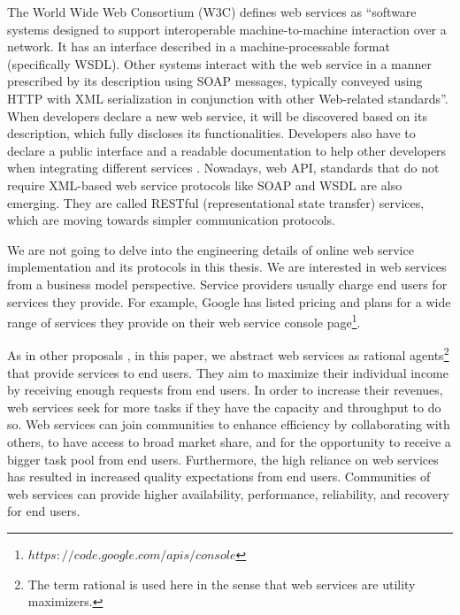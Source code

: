 The World Wide Web Consortium (W3C) defines web services as ``software systems designed to support interoperable machine-to-machine interaction over a network. It has an interface described in a machine-processable format (specifically WSDL). Other systems interact with the web service in a manner prescribed by its description using SOAP messages, typically conveyed using HTTP with XML serialization in conjunction with other Web-related standards''. When developers declare a new web service, it will be
discovered based on its description, which fully discloses its functionalities. Developers also have to declare a public interface and a readable documentation to help other developers when integrating different services \cite{w3cwsdl}. Nowadays, web API, standards that do not require XML-based web service protocols like SOAP and WSDL are also emerging. They are called RESTful (representational state transfer) services, which are moving towards simpler communication protocols.

We are not going to delve into the engineering details of online web service implementation and its protocols in this thesis. We are interested in web services from a business model perspective. Service providers usually charge end users for services they provide. For example, Google has listed pricing and plans for a wide range of services they provide on their web service console page\footnote{$https://code.google.com/apis/console$}.

As in other proposals \cite{journals/mags/BaldoniBM10,10.1109/TSC.2012.12,DBLP:conf/IEEEscc/KhosravifarABT11}, in this paper, we abstract web services as rational agents\footnote{The term rational is used here in the sense that web services are utility maximizers.} that provide services to end users. They aim to maximize their individual income  by receiving enough requests from end users. In order to increase their revenues, web services seek for more tasks if they have the capacity and throughput to do so. Web services can join communities to enhance efficiency by collaborating with others, to have access to broad market share, and for the opportunity to receive a bigger task pool from end users.
Furthermore, the high reliance on web services has resulted in increased quality expectations from end users. Communities of web services can provide higher availability, performance, reliability, and recovery for end users.

